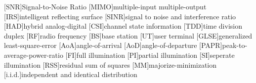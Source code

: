 \documentclass[12pt,draftclsnofoot,onecolumn,journal]{IEEEtran}
\begin{document}
\begin{acronym}
 [\ensuremath{\mathrm{SNR}}]{Signal-to-Noise Ratio}
 [MIMO]{multiple-input multiple-output}
 [IRS]{intelligent reflecting surface}
 [SINR]{signal to noise and interference ratio}
 [HAD]{hybrid analog-digital}
 [CSI]{channel state information}
 [TDD]{time division duplex}
 [RF]{radio frequency}
 [BS]{base station}
 [UT]{user terminal}
 [GLSE]{generalized least-square-error}
 [AoA]{angle-of-arrival}
 [AoD]{angle-of-departure}
 [PAPR]{peak-to-average-power-ratio}
 [FI]{full illumination}
 [PI]{partial illumination}
 [SI]{seperate illumination}
 [RSS]{residual sum of squares}
 [MM]{majorize-minimization}
  [i.i.d.]{independent and identical distribution}
\end{acronym}

	

\end{document}

